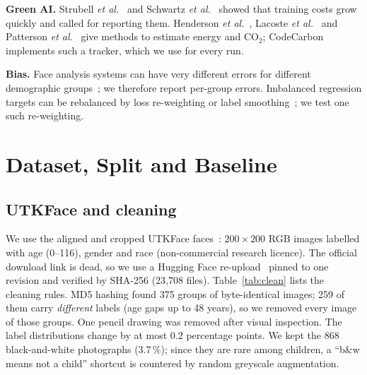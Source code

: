 \documentclass[conference,a4paper]{IEEEtran}
\newcommand{\cotwo}{CO$_2$}
\begin{document}
\textbf{Green AI.} Strubell \emph{et al.}~\cite{strubell2019energy} and Schwartz \emph{et al.}~\cite{schwartz2020green} showed that training costs grow quickly and called for reporting them. Henderson \emph{et al.}~\cite{henderson2020reporting}, Lacoste \emph{et al.}~\cite{lacoste2019quantifying} and Patterson \emph{et al.}~\cite{patterson2021carbon} give methods to estimate energy and \cotwo{}; CodeCarbon~\cite{codecarbon} implements such a tracker, which we use for every run.

\textbf{Bias.} Face analysis systems can have very different errors for different demographic groups~\cite{buolamwini2018gender}; we therefore report per-group errors. Imbalanced regression targets can be rebalanced by loss re-weighting or label smoothing~\cite{yang2021imbalanced}; we test one such re-weighting.

\section{Dataset, Split and Baseline}
\label{sec:data}
\subsection{UTKFace and cleaning}
We use the aligned and cropped UTKFace faces~\cite{zhang2017utkface}: $200\times200$ RGB images labelled with age (0--116), gender and race (non-commercial research licence). The official download link is dead, so we use a Hugging Face re-upload~\cite{huggingface_utkface} pinned to one revision and verified by SHA-256 (23{,}708 files). Table~\ref{tab:clean} lists the cleaning rules. MD5 hashing found 375 groups of byte-identical images; 259 of them carry \emph{different} labels (age gaps up to 48 years), so we removed every image of those groups. One pencil drawing was removed after visual inspection. The label distributions change by at most 0.2 percentage points. We kept the 868 black-and-white photographs (3.7\,\%); since they are rare among children, a ``b\&w means not a child'' shortcut is countered by random greyscale augmentation.
\end{document}
